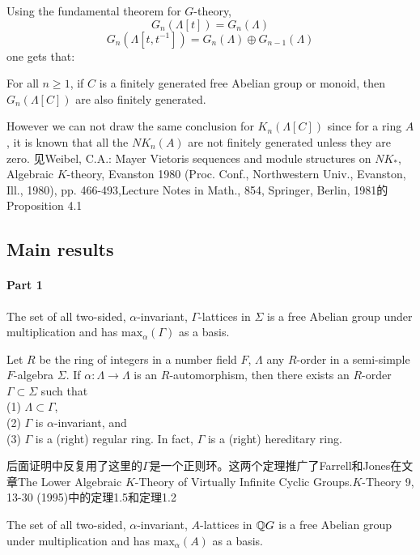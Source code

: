 Using the fundamental theorem for $G$-theory,
\[G_n(\Lambda[t])=G_n(\Lambda)\]
\[G_n(\Lambda[t,t^{-1}])=G_n(\Lambda)\oplus G_{n-1}(\Lambda)\] 
one gets that:
\begin{corollary}
For all $n \geq 1$, if $C$ is a finitely generated free Abelian group or monoid, then $G_n (\Lambda[C])$ are also finitely generated.
\end{corollary}

\begin{remark}
However we can not draw the same conclusion for $K_n(\Lambda[C])$ since for a ring $A$, it is known that {\color{red} all the $ NK_n(A)$ are not finitely generated unless they are zero}. 见Weibel, C.A.: Mayer Vietoris sequences and module structures on $NK_*$, Algebraic $K$-theory, Evanston 1980 (Proc. Conf., Northwestern Univ., Evanston, Ill., 1980), pp. 466-493,Lecture Notes in Math., 854, Springer, Berlin, 1981的Proposition 4.1
\end{remark} 
\subsection{Main results}
\paragraph{Part 1} 
\begin{theorem}[1.1]
The set of all two-sided, $\alpha$-invariant, $\Gamma$-lattices in $\Sigma$ is a free Abelian group under multiplication and has $\mathrm{max}_\alpha(\Gamma) $ as a basis.
\end{theorem}
\begin{theorem}[1.6]
Let $R$ be the ring of integers in a number field $F$, $\Lambda$ any $R$-order in a semi-simple $F$-algebra $\Sigma$. If $\alpha : \Lambda \rightarrow \Lambda $ is an $R$-automorphism, then there
exists an $R$-order $\Gamma \subset \Sigma $ such that\\
(1) $\Lambda \subset \Gamma $,\\
(2) $\Gamma$ is $\alpha$-invariant, and\\
(3) $\Gamma$ is a (right) {\color{red}regular} ring. In fact, $\Gamma$  is a (right) hereditary ring.
\end{theorem}
后面证明中反复用了这里的$\Gamma$是一个正则环。这两个定理推广了Farrell和Jones在文章The Lower Algebraic $K$-Theory of Virtually Infinite Cyclic
Groups.$K$-Theory 9, 13-30 (1995)中的定理1.5和定理1.2
\begin{theorem}
The  set  of all two-sided,  $\alpha$-invariant,  $A$-lattices in $\mathbb{Q} G$  is  a  free 
Abelian  group  under  multiplication and  has  $\mathrm{max}_{\alpha}( A ) $ as a basis. 
\end{theorem}

